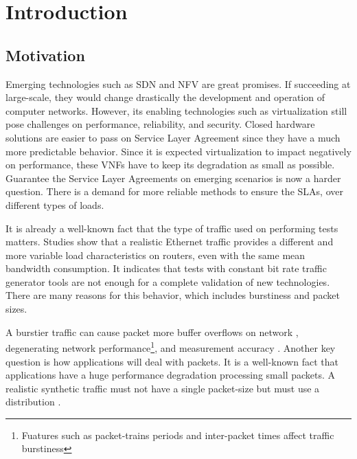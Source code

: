\chapter{Introduction}\label{ch:introduction}

\section{Motivation}
 

Emerging technologies such as SDN and NFV are great promises. If succeeding at large-scale, they would change drastically the development and operation of computer networks. However, its enabling technologies such as virtualization still pose challenges on performance,  reliability, and security\cite{nfv-challenges}. Closed hardware solutions are easier to pass on Service Layer Agreement since they have a much more predictable behavior. Since it is expected virtualization to impact negatively on performance, these VNFs have to keep its degradation as small as possible. Guarantee the Service Layer Agreements on emerging scenarios is now a harder question. There is a demand for more reliable methods to ensure the SLAs, over different types of loads.


It is already a well-known fact that the type of traffic used on performing tests matters. Studies show that a realistic Ethernet traffic provides a different and more variable load characteristics on routers\cite{harpoon-validation}, even with the same mean bandwidth consumption. It indicates that tests with constant bit rate traffic generator tools are not enough for a complete validation of new technologies. There are many reasons for this behavior, which includes burstiness and packet sizes.


A burstier traffic can cause packet more buffer overflows on network \cite{burstiness-queue-lenght} \cite{modelling-of-self-similar} \cite{empirical-interarrival-study}, degenerating network performance\footnote{Fuatures such as packet-trains periods and inter-packet times affect traffic burstiness}, and  measurement accuracy\cite{legotg-paper} \cite{background-traffic-matter}. Another key question is how applications will deal with packets. It is a well-known fact that applications have a huge performance degradation processing small packets\cite{comparative-trafficgen-tools}. A realistic synthetic traffic must not have a single packet-size but must use a distribution \cite{packet-distribution-model}. 


